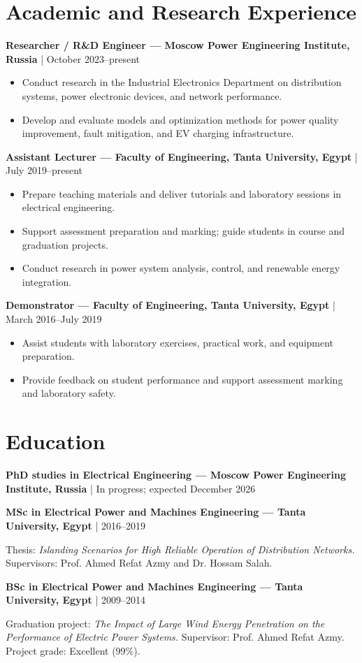 \documentclass[10pt,a4paper]{article}
\begin{document}
\section*{Academic and Research Experience}
\textbf{Researcher / R\&D Engineer — Moscow Power Engineering Institute, Russia} | October 2023–present\par
\begin{itemize}
\item Conduct research in the Industrial Electronics Department on distribution systems, power electronic devices, and network performance.
\item Develop and evaluate models and optimization methods for power quality improvement, fault mitigation, and EV charging infrastructure.
\end{itemize}
\textbf{Assistant Lecturer — Faculty of Engineering, Tanta University, Egypt} | July 2019–present\par
\begin{itemize}
\item Prepare teaching materials and deliver tutorials and laboratory sessions in electrical engineering.
\item Support assessment preparation and marking; guide students in course and graduation projects.
\item Conduct research in power system analysis, control, and renewable energy integration.
\end{itemize}
\textbf{Demonstrator — Faculty of Engineering, Tanta University, Egypt} | March 2016–July 2019\par
\begin{itemize}
\item Assist students with laboratory exercises, practical work, and equipment preparation.
\item Provide feedback on student performance and support assessment marking and laboratory safety.
\end{itemize}
\section*{Education}
\textbf{PhD studies in Electrical Engineering — Moscow Power Engineering Institute, Russia} | In progress; expected December 2026\par
\textbf{MSc in Electrical Power and Machines Engineering — Tanta University, Egypt} | 2016–2019\par
Thesis: \textit{Islanding Scenarios for High Reliable Operation of Distribution Networks.} Supervisors: Prof. Ahmed Refat Azmy and Dr. Hossam Salah.\par
\textbf{BSc in Electrical Power and Machines Engineering — Tanta University, Egypt} | 2009–2014\par
Graduation project: \textit{The Impact of Large Wind Energy Penetration on the Performance of Electric Power Systems.} Supervisor: Prof. Ahmed Refat Azmy. Project grade: Excellent (99\%).\par
\end{document}
